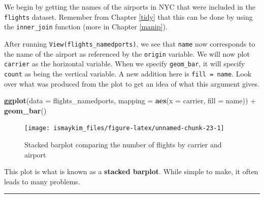 \documentclass[]{tufte-book}
\newenvironment{Shaded}{\begin{snugshade}}{\end{snugshade}}
\newcommand{\KeywordTok}[1]{\textcolor[rgb]{0.13,0.29,0.53}{\textbf{{#1}}}}
\newcommand{\DataTypeTok}[1]{\textcolor[rgb]{0.13,0.29,0.53}{{#1}}}
\newcommand{\StringTok}[1]{\textcolor[rgb]{0.31,0.60,0.02}{{#1}}}
\newcommand{\NormalTok}[1]{{#1}}
\let\oldrule=\rule
\renewcommand{\rule}[1]{\oldrule{\linewidth}}
\begin{document}
We begin by getting the names of the airports in NYC that were included
in the \texttt{flights} dataset. Remember from Chapter \ref{tidy} that
this can be done by using the \texttt{inner\_join} function (more in
Chapter \ref{manip}).

\begin{Shaded}
\end{Shaded}

After running \texttt{View(flights\_namedports)}, we see that
\texttt{name} now corresponds to the name of the airport as referenced
by the \texttt{origin} variable. We will now plot \texttt{carrier} as
the horizontal variable. When we specify \texttt{geom\_bar}, it will
specify \texttt{count} as being the vertical variable. A new addition
here is \texttt{fill\ =\ name}. Look over what was produced from the
plot to get an idea of what this argument gives.

\begin{Shaded}
\begin{Highlighting}[]
\KeywordTok{ggplot}\NormalTok{(}\DataTypeTok{data =} \NormalTok{flights_namedports, }\DataTypeTok{mapping =} \KeywordTok{aes}\NormalTok{(}\DataTypeTok{x =} \NormalTok{carrier, }\DataTypeTok{fill =} \NormalTok{name)) +}
\StringTok{  }\KeywordTok{geom_bar}\NormalTok{()}
\end{Highlighting}
\end{Shaded}

\begin{figure}

{\centering \texttt{[image: ismaykim\_files/figure-latex/unnamed-chunk-23-1]} 

}

\caption[Stacked barplot comparing the number of flights by carrier and airport]{Stacked barplot comparing the number of flights by carrier and airport}\label{fig:unnamed-chunk-23}
\end{figure}

This plot is what is known as a \textbf{stacked barplot}. While simple
to make, it often leads to many problems.

\begin{center}\rule{0.5\linewidth}{\linethickness}\end{center}
\end{document}
